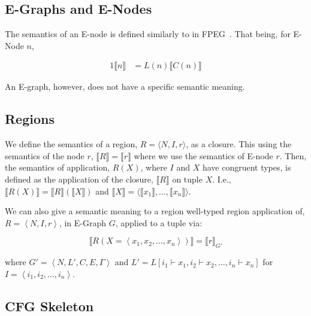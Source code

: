 \documentclass{article}
\begin{document}
\subsection{E-Graphs and E-Nodes}

The semantics of an E-node is defined similarly to in FPEG~\cite{dellaneve_2023}. That being, for E-Node $n$,

\begin{alignat*}{1}
  \llbracket n \rrbracket &= L(n) \llbracket C(n) \rrbracket
\end{alignat*}


An E-graph, however, does not have a specific semantic meaning.


\subsection{Regions}

We define the semantics of a region, $R = \langle N, I, r \rangle$, as a closure. This using the semantics of the node $r$, $\llbracket R \rrbracket = \llbracket r \rrbracket$ where we use the semantics of E-node $r$. Then, the semantics of application, $R (X)$, where $I$ and $X$ have congruent types, is defined as the application of the closure, $\llbracket R \rrbracket$ on tuple $X$. I.e., $\llbracket R (X) \rrbracket = \llbracket R \rrbracket \left( \llbracket X \rrbracket \right)$ and $\llbracket X \rrbracket = \langle \llbracket x_1 \rrbracket, \dots, \llbracket x_n \rrbracket \rangle$.

We can also give a semantic meaning to a region well-typed region application of, $R = \left\langle N, I, r \right\rangle$, in E-Graph $G$, applied to a tuple via:

$$
  \llbracket R \left( X = \left\langle x_1, x_2, \dots , x_n \right\rangle \right) \rrbracket = \llbracket r \rrbracket_{G'}
$$

where $G' = \left\langle N, L', C, E, \Gamma \right\rangle$ and $L' = L[i_1 \vdash x_1, i_2 \vdash x_2, \dots, i_n \vdash x_n]$ for $I= \left\langle i_1, i_2, \dots, i_n \right\rangle$.


\subsection{CFG Skeleton}
\end{document}
